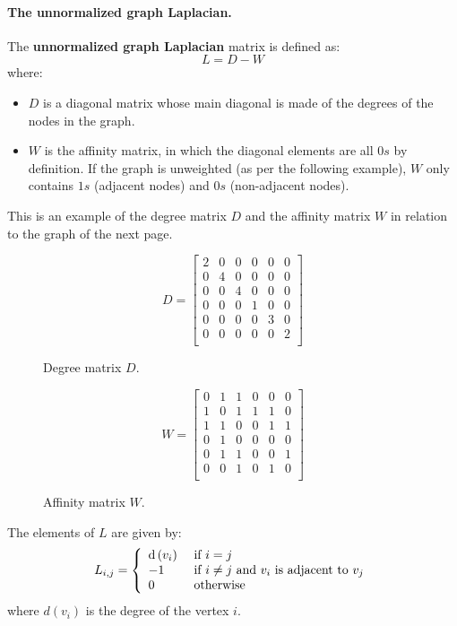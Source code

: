 \paragraph{The unnormalized graph Laplacian.} The  \textbf{unnormalized graph Laplacian} matrix is defined as:
$$L = D - W$$
where:
\begin{itemize}
	\item $D$ is a diagonal matrix whose main diagonal is made of the degrees of the nodes in the graph.
	\item $W$ is the affinity matrix, in which the diagonal elements are all $0s$ by definition. If the graph is unweighted (as per the following example), $W$ only contains $1s$ (adjacent nodes) and $0s$ (non-adjacent nodes).
\end{itemize}
This is an example of the degree matrix $D$ and the affinity matrix $W$ in relation to the graph of the next page.
\begin{figure}[H]
	\begin{minipage}[t]{0.49\linewidth} 
		\centering
		$$ D = \begin{bmatrix}
		2 & 0 & 0 & 0 & 0 & 0 \\
		0 & 4 & 0 & 0 & 0 & 0 \\
		0 & 0 & 4 & 0 & 0 & 0 \\
		0 & 0 & 0 & 1 & 0 & 0 \\
		0 & 0 & 0 & 0 & 3 & 0 \\
		0 & 0 & 0 & 0 & 0 & 2 \\
		\end{bmatrix}$$
		\caption{Degree matrix $D$.}
	\end{minipage}        
	\hspace{1cm}
	\begin{minipage}[t]{0.49\linewidth} 
		\centering
		$$ W = \begin{bmatrix}
		0 & 1 & 1 & 0 & 0 & 0 \\
		1 & 0 & 1 & 1 & 1 & 0 \\
		1 & 1 & 0 & 0 & 1 & 1 \\
		0 & 1 & 0 & 0 & 0 & 0 \\
		0 & 1 & 1 & 0 & 0 & 1 \\
		0 & 0 & 1 & 0 & 1 & 0 \\
		\end{bmatrix}$$
		\caption{Affinity matrix $W$.}
	\end{minipage}
\end{figure}

The elements of $L$ are given by:
$$
L _ { i , j } = \left\{ \begin{array} { l l } { \operatorname { d } \left( v _ { i } \right) } & { \text { if } i = j } \\ 
{ - 1 } & { \text { if } i \neq j \text { and } v _ { i } \text { is adjacent to } v _ { j } } \\ 
{ 0 } & { \text { otherwise } } \end{array} \right.
$$
where $d(v_i)$ is the degree of the vertex $i$.


